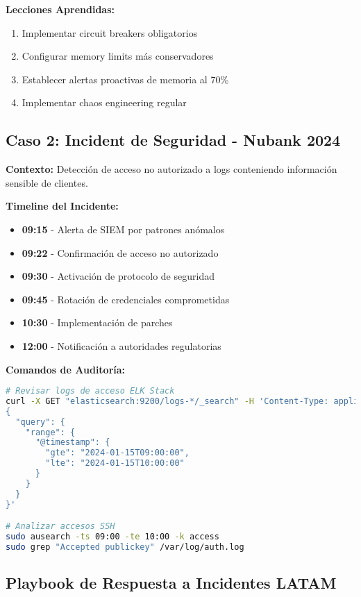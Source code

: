 \documentclass[12pt,a4paper]{article}
\begin{document}
\textbf{Lecciones Aprendidas:}
\begin{enumerate}
    \item Implementar circuit breakers obligatorios
    \item Configurar memory limits más conservadores
    \item Establecer alertas proactivas de memoria al 70\%
    \item Implementar chaos engineering regular
\end{enumerate}

\subsection{Caso 2: Incident de Seguridad - Nubank 2024}

\textbf{Contexto:} Detección de acceso no autorizado a logs conteniendo información sensible de clientes.

\textbf{Timeline del Incidente:}
\begin{itemize}
    \item \textbf{09:15} - Alerta de SIEM por patrones anómalos
    \item \textbf{09:22} - Confirmación de acceso no autorizado
    \item \textbf{09:30} - Activación de protocolo de seguridad
    \item \textbf{09:45} - Rotación de credenciales comprometidas
    \item \textbf{10:30} - Implementación de parches
    \item \textbf{12:00} - Notificación a autoridades regulatorias
\end{itemize}

\textbf{Comandos de Auditoría:}
\begin{lstlisting}[language=bash, caption=Investigación forense]
# Revisar logs de acceso ELK Stack
curl -X GET "elasticsearch:9200/logs-*/_search" -H 'Content-Type: application/json' -d'
{
  "query": {
    "range": {
      "@timestamp": {
        "gte": "2024-01-15T09:00:00",
        "lte": "2024-01-15T10:00:00"
      }
    }
  }
}'

# Analizar accesos SSH
sudo ausearch -ts 09:00 -te 10:00 -k access
sudo grep "Accepted publickey" /var/log/auth.log
\end{lstlisting}

\subsection{Playbook de Respuesta a Incidentes LATAM}
\end{document}
